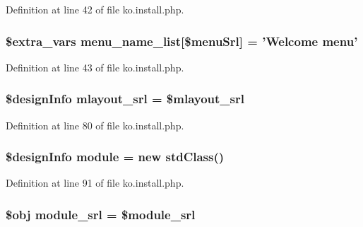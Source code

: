 Definition at line 42 of file ko.\+install.\+php.

\hypertarget{ko_8install_8php_aab93e295f18667faa1458cf574553e1f}{
\subsubsection[{menu\+\_\+name\+\_\+list}]{\setlength{\rightskip}{0pt plus 5cm}\${\bf extra\+\_\+vars} menu\+\_\+name\+\_\+list\mbox{[}\$menu\+Srl\mbox{]} = 'Welcome {\bf menu}'}}\label{ko_8install_8php_aab93e295f18667faa1458cf574553e1f}


Definition at line 43 of file ko.\+install.\+php.

\hypertarget{ko_8install_8php_a9cf497537007b08c645bed35f564be54}{
\subsubsection[{mlayout\+\_\+srl}]{\setlength{\rightskip}{0pt plus 5cm}\$design\+Info mlayout\+\_\+srl = \$mlayout\+\_\+srl}}\label{ko_8install_8php_a9cf497537007b08c645bed35f564be54}


Definition at line 80 of file ko.\+install.\+php.

\hypertarget{ko_8install_8php_a5c3fc1968f94c2b6a7c60845f284de78}{
\subsubsection[{module}]{\setlength{\rightskip}{0pt plus 5cm}\$design\+Info {\bf module} = new std\+Class()}}\label{ko_8install_8php_a5c3fc1968f94c2b6a7c60845f284de78}


Definition at line 91 of file ko.\+install.\+php.

\hypertarget{ko_8install_8php_a370bb6450fab1da3e0ed9f484a38b761}{
\subsubsection[{module\+\_\+srl}]{\setlength{\rightskip}{0pt plus 5cm}\$obj module\+\_\+srl = \$module\+\_\+srl}}\label{ko_8install_8php_a370bb6450fab1da3e0ed9f484a38b761}


